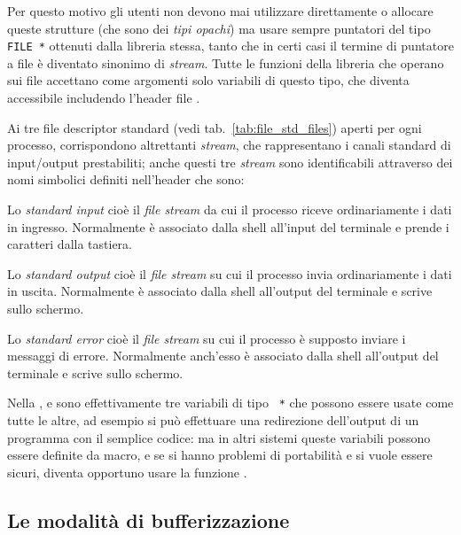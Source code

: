 Per questo motivo gli utenti non devono mai utilizzare direttamente o allocare
queste strutture (che sono dei \textsl{tipi opachi}) ma usare sempre puntatori
del tipo \texttt{FILE *} ottenuti dalla libreria stessa, tanto che in certi
casi il termine di puntatore a file è diventato sinonimo di \textit{stream}.
Tutte le funzioni della libreria che operano sui file accettano come argomenti
solo variabili di questo tipo, che diventa accessibile includendo l'header
file .


Ai tre file descriptor standard (vedi tab.~\ref{tab:file_std_files}) aperti
per ogni processo, corrispondono altrettanti \textit{stream}, che
rappresentano i canali standard di input/output prestabiliti; anche questi tre
\textit{stream} sono identificabili attraverso dei nomi simbolici definiti
nell'header  che sono:

\begin{basedescript}{\desclabelwidth{3.0cm}}
\item[\var{FILE *stdin}] Lo \textit{standard input} cioè il \textit{file
    stream} da cui il processo riceve ordinariamente i dati in
  ingresso. Normalmente è associato dalla shell all'input del terminale e
  prende i caratteri dalla tastiera.
\item[\var{FILE *stdout}] Lo \textit{standard output} cioè il \textit{file
    stream} su cui il processo invia ordinariamente i dati in
  uscita. Normalmente è associato dalla shell all'output del terminale e
  scrive sullo schermo.
\item[\var{FILE *stderr}] Lo \textit{standard error} cioè il \textit{file
    stream} su cui il processo è supposto inviare i messaggi di
  errore. Normalmente anch'esso è associato dalla shell all'output del
  terminale e scrive sullo schermo.
\end{basedescript}

Nella  ,  e  sono effettivamente
tre variabili di tipo \texttt{ *} che possono essere usate come
tutte le altre, ad esempio si può effettuare una redirezione dell'output di un
programma con il semplice codice:  ma
in altri sistemi queste variabili possono essere definite da macro, e se si
hanno problemi di portabilità e si vuole essere sicuri, diventa opportuno
usare la funzione .


\subsection{Le modalità di bufferizzazione}
\label{sec:file_buffering}

